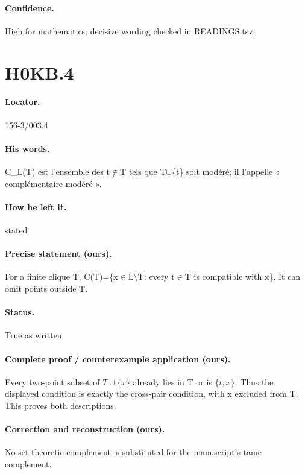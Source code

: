 \paragraph{Confidence.} High for mathematics; decisive wording checked in READINGS.tsv.

\section*{H0KB.4}\label{statement:H0KB.4}
\paragraph{Locator.} 156-3/003.4

\paragraph{His words.} C\_L(T) est l’ensemble des t\ensuremath{\notin}T tels que T\ensuremath{\cup}\{t\} soit modéré; il l’appelle « complémentaire modéré ».

\paragraph{How he left it.} stated

\paragraph{Precise statement (ours).} For a finite clique T, C(T)=\{x\ensuremath{\in}L\ensuremath{\setminus}T: every t\ensuremath{\in}T is compatible with x\}. It can omit points outside T.

\paragraph{Status.} True as written

\paragraph{Complete proof / counterexample application (ours).} Every two-point subset of \(T\cup\{x\}\) already lies in T or is \(\{t,x\}\). Thus the displayed condition is exactly the cross-pair condition, with x excluded from T. This proves both descriptions.

\paragraph{Correction and reconstruction (ours).} No set-theoretic complement is substituted for the manuscript’s tame complement.

